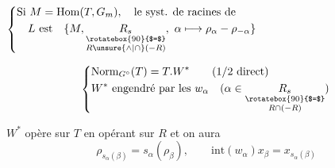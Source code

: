 $\left\{\begin{aligned}
&\text{Si }M=\mathrm{Hom}(T,G_m),\quad\text{le syst. de racines de}\\
&\quad L\ \text{est}\quad
 \{M,\underset{\substack{\rotatebox{90}{$=$}\\R\mathbin{\unsure{\wedge|\cap}}(-R)}}{R_s},\
 \alpha\longmapsto\rho_\alpha-\rho_{-\alpha}\}
\end{aligned}\right.$

\[
\left\{\begin{aligned}
&\mathrm{Norm}_{G^\circ}(T)=T.W^*\qquad (1/2\ \text{direct})\\
&W^*\ \text{engendré par les }w_\alpha\quad
(\alpha\in\underset{\substack{\rotatebox{90}{$=$}\\R\cap(-R)}}{R_s})
\end{aligned}\right.
\]

$W^*$ opère sur $T$ en opérant sur  $R$ et on aura
\[
\rho_{s_\alpha(\beta)}=s_\alpha(\rho_\beta),\qquad
\mathrm{int}(w_\alpha)x_\beta=x_{s_\alpha(\beta)}
\]

